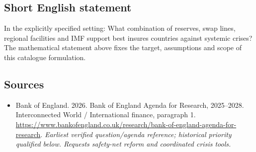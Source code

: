 \documentclass[11pt]{article}
\begin{document}
\subsection{Short English statement}
In the explicitly specified setting: What combination of reserves, swap lines, regional facilities and IMF support best insures countries against systemic crises? The mathematical statement above fixes the target, assumptions and scope of this catalogue formulation.

\subsection{Sources}
\begin{itemize}\raggedright
\item[\textnormal{[S1]}]\hypertarget{source:30007621:1}{} Bank of England. 2026. Bank of England Agenda for Research, 2025–2028. Interconnected World / International finance, paragraph 1.
\url{https://www.bankofengland.co.uk/research/bank-of-england-agenda-for-research}.
{\small\textit{Earliest verified question/agenda reference; historical priority qualified below. Requests safety-net reform and coordinated crisis tools.}}
\end{itemize}
\end{document}
